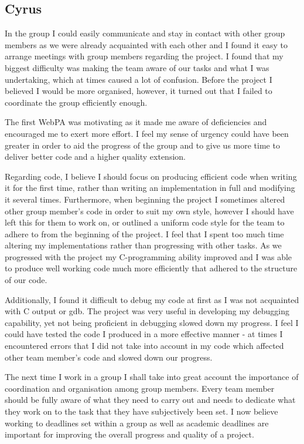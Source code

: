 \documentclass[11pt]{article}
\begin{document}
\subsection{Cyrus}

In the group I could easily communicate and stay in contact with other group members as we were already acquainted with each other and I found it easy to arrange meetings with group members regarding the project. I found that my biggest difficulty was making the team aware of our tasks and what I was undertaking, which at times caused a lot of confusion. Before the project I believed I would be more organised, however, it turned out that I failed to coordinate the group efficiently enough. 

The first WebPA was motivating as it made me aware of deficiencies and encouraged me to exert more effort. I feel my sense of urgency could have been greater in order to aid the progress of the group and to give us more time to deliver better code and a higher quality extension. 

Regarding code, I believe I should focus on producing efficient code when writing it for the first time, rather than writing an  implementation in full and modifying it several times. Furthermore, when beginning the project I sometimes altered other group member’s code in order to suit my own style, however I should have left this for them to work on, or outlined a uniform code style for the team to adhere to from the beginning of the project. I feel that I spent too much time altering my implementations rather than progressing with other tasks. As we progressed with the project my C-programming ability improved and I was able to produce well working code much more efficiently that adhered to the structure of our code.

Additionally, I found it difficult to debug my code at first as I was not acquainted with C output or gdb. The project was very useful in developing my debugging capability, yet not being proficient in debugging slowed down my progress. I feel I could have tested the code I produced in a more effective manner - at times I encountered errors that I did not take into account in my code which affected other team member’s code and slowed down our progress.

The next time I work in a group I shall take into great account the importance of coordination and organisation among group members. Every team member should be fully aware of what they need to carry out and needs to dedicate what they work on to the task that they have subjectively been set. I now believe working to deadlines set within a group as well as academic deadlines are important for improving the overall progress and quality of a project.
\end{document}
